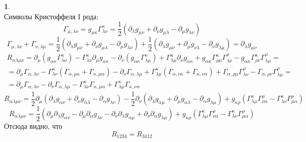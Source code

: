 \documentclass[12pt]{article}
\theoremstyle{definition}
\newtheorem{zad}{}[section]
\begin{document}
\begin{zad}
\begin{equation}
\end{equation}
Символы Кристоффеля I рода:
\begin{equation}
    \Gamma_{\mu,\lambda\nu}=g_{\mu\kappa}\Gamma^\kappa_{\lambda\nu}=\frac{1}{2}(\partial_\lambda g_{\mu\nu}+\partial_\nu g_{\mu\lambda}-\partial_\mu g_{\lambda\nu})
\end{equation}
\begin{equation}
    \Gamma_{\mu,\lambda\nu}+\Gamma_{\nu,\lambda\mu}=\frac{1}{2}(\partial_\lambda g_{\mu\nu}+\partial_\nu g_{\mu\lambda}-\partial_\mu g_{\lambda\nu})+\frac{1}{2}(\partial_\lambda g_{\mu\nu}+\partial_\mu g_{\nu\lambda}-\partial_\nu g_{\lambda\mu})=\partial_\lambda g_{\mu\nu}
\end{equation}
\begin{multline}
    R_{\alpha\lambda\mu\nu}=\partial_\mu( g_{\alpha\kappa}\Gamma^\kappa_{\lambda\nu})-\Gamma^\kappa_{\lambda\nu}\partial_\mu g_{\alpha\kappa}-\partial_\nu( g_{\alpha\kappa}\Gamma^\kappa_{\lambda\mu})+\Gamma^\kappa_{\lambda\mu}\partial_\nu g_{\alpha\kappa}+g_{\alpha\kappa}\Gamma^\kappa_{\rho\mu}\Gamma^\rho_{\lambda\nu}-g_{\alpha\kappa}\Gamma^\kappa_{\rho\nu}\Gamma^\rho_{\lambda\mu}=\\=\partial_\mu\Gamma_{\alpha,\lambda\nu}-\Gamma^\kappa_{\lambda\nu}(\Gamma_{\alpha,\mu\kappa}+\Gamma_{\kappa,\mu\alpha})-\partial_\nu\Gamma_{\alpha,\lambda\mu}+\Gamma^\kappa_{\lambda\mu}(\Gamma_{\alpha,\nu\kappa}+\Gamma_{\kappa,\nu\alpha})+\Gamma_{\alpha,\rho\mu}\Gamma^\rho_{\lambda\nu}-\Gamma_{\alpha,\rho\nu}\Gamma^\rho_{\lambda\mu}=\\=\partial_\mu\Gamma_{\alpha,\lambda\nu}-\partial_\nu\Gamma_{\alpha,\lambda\mu}-\Gamma^\kappa_{\lambda\nu}\Gamma_{\kappa,\mu\alpha}+\Gamma^\kappa_{\lambda\mu}\Gamma_{\kappa,\nu\alpha}
\end{multline}
\begin{equation}
    R_{\alpha\lambda\mu\nu}=\frac{1}{2}\partial_\mu(\partial_\lambda g_{\alpha\nu}+\partial_\nu g_{\alpha\lambda}-\partial_\alpha g_{\lambda\nu})-\frac{1}{2}\partial_\nu(\partial_\lambda g_{\alpha\mu}+\partial_\mu g_{\alpha\lambda}-\partial_\alpha g_{\lambda\mu})+g_{\kappa\rho}(\Gamma^\kappa_{\lambda\mu}\Gamma^\rho_{\nu\alpha}-\Gamma^\kappa_{\lambda\nu}\Gamma^\rho_{\mu\alpha})
\end{equation}
\begin{equation}
    R_{\alpha\lambda\mu\nu}=\frac{1}{2}(\partial_\mu\partial_\lambda g_{\alpha\nu}-\partial_\mu\partial_\alpha g_{\lambda\nu}-\partial_\nu\partial_\lambda g_{\alpha\mu}+\partial_\nu\partial_\alpha g_{\lambda\mu})+g_{\kappa\rho}(\Gamma^\kappa_{\lambda\mu}\Gamma^\rho_{\nu\alpha}-\Gamma^\kappa_{\lambda\nu}\Gamma^\rho_{\mu\alpha})
\end{equation}
Отсюда видно, что
\begin{equation}
    \boxed{R_{1234}=R_{3412}}
\end{equation}
\end{zad}
\end{document}
